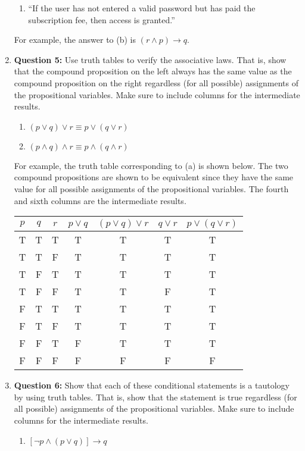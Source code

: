 \documentclass[11pt]{article}
\begin{document}
\begin{enumerate}
\begin{enumerate}[label=(\alph*)]
\item ``If the user has not entered a valid password but has paid the subscription
fee, then access is granted.''
\end{enumerate}
For example, the answer to (b) is $(r \land p) \rightarrow q$.
\item
\textbf{Question 5:}
Use truth tables to verify the associative laws. That is, show that the compound
proposition on the left always has the same value as the compound proposition on
the right regardless (for all possible) assignments of the propositional variables.
Make sure to include columns for the intermediate results.
\begin{enumerate}[label=(\alph*)]
\item $(p \lor q) \lor r \equiv p \lor (q \lor r)$
\item $(p \land q) \land r \equiv p \land (q \land r)$
\end{enumerate}
For example, the truth table corresponding to (a) is shown below. The two compound
propositions are shown to be equivalent since they have the same value for all
possible assignments of the propositional variables. The fourth and sixth columns
are the intermediate results.
\begin{center}
\begin{tabular}{|c|c|c|c|c|c|c|}
\hline
$p$ & $q$ & $r$ & $p \lor q$ & $(p \lor q) \lor r$ & $q \lor r$ & $p \lor (q \lor
r)$\\
\hline
T & T & T & T & T & T & T\\
T & T & F & T & T & T & T\\
T & F & T & T & T & T & T\\
T & F & F & T & T & F & T\\
F & T & T & T & T & T & T\\
F & T & F & T & T & T & T\\
F & F & T & F & T & T & T\\
F & F & F & F & F & F & F\\
\hline
\end{tabular}
\end{center}
\item
\textbf{Question 6:}
Show that each of these conditional statements is a tautology by using truth
tables. That is, show that the statement is true regardless (for all possible)
assignments of the propositional variables. Make sure to include columns for the
intermediate results.
\begin{enumerate}[label=(\alph*)]
\item $[\lnot p \land (p \lor q)] \rightarrow q$

\end{enumerate}
\end{enumerate}
\end{document}

